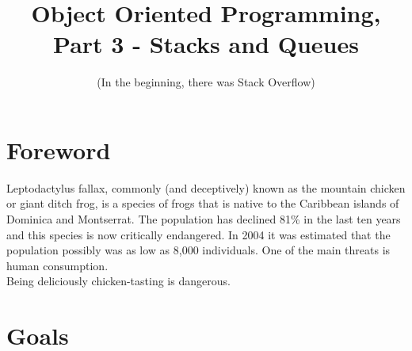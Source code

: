 \documentclass{42-en}
\begin{document}
				
				
		\title{Object Oriented Programming, Part 3 - Stacks and Queues}
        \subtitle{(In the beginning, there was Stack Overflow)}


\maketitle

\tableofcontents


\chapter{Foreword}

	Leptodactylus fallax, commonly (and deceptively) known as the mountain 
	chicken or giant ditch frog, is a species of frogs that is native to the
	Caribbean islands of Dominica and Montserrat. The population has declined 
	81\% in the last ten years and this species is now critically endangered. 
	In 2004 it was estimated that the population possibly was as low as 8,000 individuals.
	One of the main threats is human consumption. \\
	
	Being deliciously chicken-tasting is dangerous. \\

\chapter{Goals}
\end{document}

